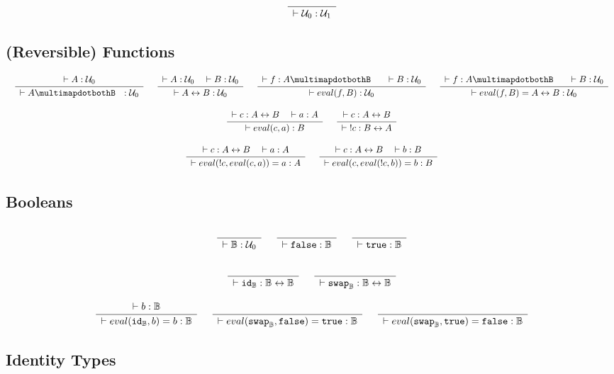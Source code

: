 \documentclass[format=acmlarge,review,natbib]{acmart}
\newcommand{\invc}[1]{!#1}
\newcommand{\evalone}[2]{eval(#1,#2)}
\newcommand{\idc}{\mathtt{id}}
\newcommand{\swapc}{\mathtt{swap}}
\newcommand{\iso}{\leftrightarrow}
\newcommand{\piso}{\multimapdotbothB~~}
\newcommand{\fc}{\mathtt{false}}
\newcommand{\tc}{\mathtt{true}}
\newcommand{\boolt}{\mathbb{B}}
\newcommand{\uzero}{\mathcal{U}_0}
\newcommand{\uone}{\mathcal{U}_1}
\newcommand{\Rule}[2]{
\makebox{
$\displaystyle
\frac{\begin{array}{l}#1\\\end{array}}
{\begin{array}{l}#2\\\end{array}}$}}
\newcommand{\proves}{\vdash}
\newcommand{\jdg}[3]{#1 \proves #2 : #3}
\begin{document}
\[
\Rule{}{\jdg{}{\uzero}{\uone}}
\]

\subsection{(Reversible) Functions}

\[\begin{array}{c}
\Rule{\jdg{}{A}{\uzero}}
        {\jdg{}{A\piso}{\uzero}}
\quad
\Rule{\jdg{}{A}{\uzero}
         \quad \jdg{}{B}{\uzero}}
        {\jdg{}{A\iso B}{\uzero}}
\quad
\Rule{\jdg{}{f}{A \piso}
         \quad\jdg{}{B}{\uzero}}
        {\jdg{}{\evalone{f}{B}}{\uzero}}
\quad
\Rule{\jdg{}{f}{A \piso}
         \quad\jdg{}{B}{\uzero}}
        {\jdg{}{\evalone{f}{B} = A \iso B}{\uzero}}
\\
\\
\Rule{\jdg{}{c}{A \iso B}
         \quad\jdg{}{a}{A}}
        {\jdg{}{\evalone{c}{a}}{B}}
\quad
\Rule{\jdg{}{c}{A \iso B}}
        {\jdg{}{\;\invc{c}}{B \iso A}}
\\
\\
\Rule{\jdg{}{c}{A \iso B}
         \quad\jdg{}{a}{A}}
        {\jdg{}{\evalone{\invc{c}}{\evalone{c}{a}} = a}{A}}
\quad
\Rule{\jdg{}{c}{A \iso B}
         \quad\jdg{}{b}{B}}
        {\jdg{}{\evalone{c}{\evalone{\invc{c}}{b}} = b}{B}}
\end{array}\]

\subsection{Booleans}

\[\begin{array}{c}
\Rule{}{\jdg{}{\boolt}{\uzero}}
\quad
\Rule{}{\jdg{}{\fc}{\boolt}}
\quad
\Rule{}{\jdg{}{\tc}{\boolt}}
\\
\\
\Rule{}{\jdg{}{\idc_{\boolt}}{\boolt\iso\boolt}}
\quad
\Rule{}{\jdg{}{\swapc_{\boolt}}{\boolt\iso\boolt}}
\\
\\
\Rule{\jdg{}{b}{\boolt}}
        {\jdg{}{\evalone{\idc_{\boolt}}{b} = b}{\boolt}}
\quad
\Rule{}
        {\jdg{}{\evalone{\swapc_{\boolt}}{\fc} = \tc}{\boolt}}
\quad
\Rule{}
        {\jdg{}{\evalone{\swapc_{\boolt}}{\tc} = \fc}{\boolt}}
\end{array}\]

\subsection{Identity Types}
\end{document}
